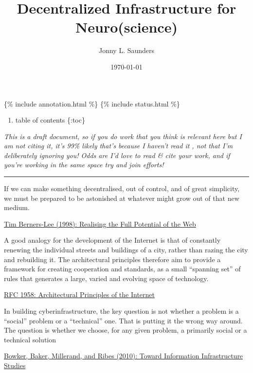 \documentclass[11pt]{article}
\title{Decentralized Infrastructure for Neuro(science)}
\author{Jonny L. Saunders}
\date{\today}
\begin{document}
\maketitle
\tableofcontents
\pagebreak

\{\% include annotation.html \%\} \{\% include status.html \%\}

\begin{enumerate}
\def\labelenumi{\arabic{enumi}.}

\item
  table of contents \{:toc\}
\end{enumerate}

\emph{This is a draft document, so if you do work that you think is
relevant here but I am not citing it, it's 99\% likely that's because I
haven't read it , not that I'm deliberately ignoring you! Odds are I'd
love to read \& cite your work, and if you're working in the same space
try and join efforts!}

\begin{center}\rule{0.5\linewidth}{0.5pt}\end{center}

\begin{leftbar}
If we can make something decentralised, out of control, and of great
simplicity, we must be prepared to be astonished at whatever might grow
out of that new medium.

\href{https://www.w3.org/1998/02/Potential.html}{Tim Berners-Lee (1998):
Realising the Full Potential of the Web}
\end{leftbar}

\begin{leftbar}
A good analogy for the development of the Internet is that of constantly
renewing the individual streets and buildings of a city, rather than
razing the city and rebuilding it. The architectural principles
therefore aim to provide a framework for creating cooperation and
standards, as a small ``spanning set'' of rules that generates a large,
varied and evolving space of technology.

\href{https://datatracker.ietf.org/doc/html/rfc1958}{RFC 1958:
Architectural Principles of the Internet}
\end{leftbar}

\begin{leftbar}
In building cyberinfrastructure, the key question is not whether a
problem is a ``social'' problem or a ``technical'' one. That is putting
it the wrong way around. The question is whether we choose, for any
given problem, a primarily social or a technical solution

\href{https://doi.org/10.1007/978-1-4020-9789-8_5}{Bowker, Baker,
Millerand, and Ribes (2010): Toward Information Infrastructure Studies}
\cite{bowkerInformationInfrastructureStudies2010} 
\end{leftbar}
\end{document}
